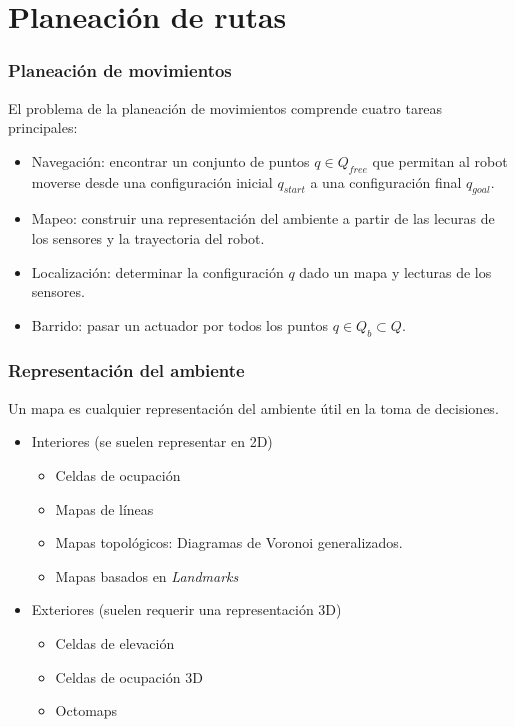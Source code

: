 \section{Planeación de rutas}

\begin{frame}\frametitle{Planeación de movimientos}
  El problema de la planeación de movimientos comprende cuatro tareas principales:
  \begin{itemize}
  \item Navegación: encontrar un conjunto de puntos $q \in Q_{free}$ que permitan al robot moverse desde una configuración inicial $q_{start}$ a una configuración final $q_{goal}$. 
  \item Mapeo: construir una representación del ambiente a partir de las lecuras de los sensores y la trayectoria del robot. 
  \item Localización: determinar la configuración $q$ dado un mapa y lecturas de los sensores. 
  \item Barrido: pasar un actuador por todos los puntos $q\in Q_b \subset Q$.
  \end{itemize}
\end{frame}

\begin{frame}\frametitle{Representación del ambiente}
  Un mapa es cualquier representación del ambiente útil en la toma de decisiones.
  \begin{itemize}
  \item Interiores (se suelen representar en 2D)
    \begin{itemize}
    \item Celdas de ocupación
    \item Mapas de líneas
    \item Mapas topológicos: Diagramas de Voronoi generalizados. 
    \item Mapas basados en \textit{Landmarks}
    \end{itemize}
  \item Exteriores (suelen requerir una representación 3D)
    \begin{itemize}
    \item Celdas de elevación
    \item Celdas de ocupación 3D
    \item Octomaps
    \end{itemize}
  \end{itemize}
\end{frame}

